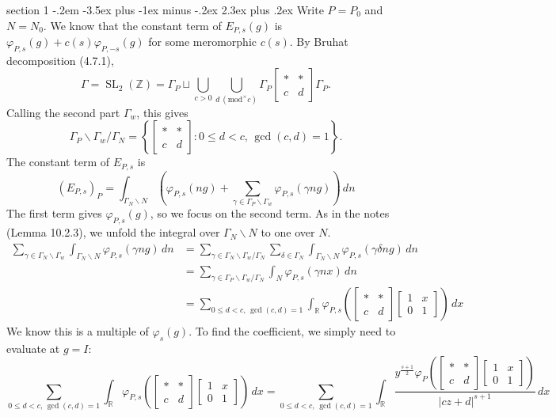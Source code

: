\documentclass[12pt]{article}
\makeatletter
\theoremstyle{norm}
\newcommand{\R}[0]{\mathbb{R}}
\newcommand{\Z}[0]{\mathbb{Z}}
\newcommand{\ga}[0]{\gamma}
\newcommand{\Ga}[0]{\Gamma}
\newcommand{\de}[0]{\delta}
\newcommand{\ph}[0]{\varphi}
\newcommand{\bc}[1]{\left\{ {#1} \right\}}
\newcommand{\pa}[1]{\left( {#1} \right)}
\newcommand{\SL}{\operatorname{SL}}
\newcommand{\bs}[0]{\backslash}
\newcommand{\mmod}[1]{\,(\text{mod}^{\times} #1)}
\newcommand{\matt}[4]{
\left[
\begin{matrix}
{#1}&{#2}\\
{#3}&{#4}
\end{matrix}
\right]}
\newcommand{\smatt}[4]{
\left[
\begin{smallmatrix}
{#1}&{#2}\\
{#3}&{#4}
\end{smallmatrix}
\right]}
\newcommand{\ir}[0]{\int_{\R}}
\newenvironment{problem}{\@startsection
       {section}
       {1}
       {-.2em}
       {-3.5ex plus -1ex minus -.2ex}
       {2.3ex plus .2ex}
       {\pagebreak[3]%
       \large\bf\noindent{Problem }
       }
       }
       {
       }
\makeatother
\begin{document}
\begin{problem}{\it }
Write $P=P_0$ and $N=N_0$. We know that the constant term of $E_{P,s}(g)$ is $\ph_{P,s}(g)+c(s)\ph_{P,-s}(g)$ for some meromorphic $c(s)$. By Bruhat decomposition (4.7.1), %
\[
\Ga=\SL_2(\Z)=\Ga_P\sqcup \bigcup_{c>0}\bigcup_{d\mmod{c}} \Ga_P\matt**cd\Ga_P.
\]
Calling the second part $\Ga_w$, this gives
\[
\Ga_P\bs\Ga_w/\Ga_N=\bc{\matt**cd:0\le d<c,\,\gcd(c,d)=1}.
\]
The constant term of $E_{P,s}$ is
\begin{equation}\label{ps11-1}
(E_{P,s})_P=\int_{\Ga_N\bs N} \pa{
\ph_{P,s}(ng)+\sum_{\ga\in \Ga_P\bs\Ga_w} \ph_{P,s}(\ga ng)
}\,dn
\end{equation}
The first term gives $\ph_{P,s}(g)$, so we focus on the second term. As in the notes (Lemma 10.2.3), we unfold the integral over $\Ga_N\bs N$ to one over $N$.
\begin{align*}
\sum_{\ga\in \Ga_N\bs \Ga_w} \int_{\Ga_N\bs N} \ph_{P,s}(\ga ng)
\,dn
&=\sum_{\ga\in \Ga_N\bs \Ga_w/\Ga_N}\sum_{\de\in \Ga_N} \int_{\Ga_N\bs N} \ph_{P,s}(\ga \de ng)
\,dn\\
&=\sum_{\ga\in \Ga_P\bs \Ga_w/\Ga_N} \int_N \ph_{P,s} (\ga nx)\,dn\\
&=\sum_{0\le d<c,\,\gcd(c,d)=1}\ir\ph_{P,s}\pa{
\matt **cd\matt 1x01
}\,dx
\end{align*}
%
We know this is a multiple of $\ph_s(g)$. To find the coefficient, we simply need to evaluate at $g=I$:
\[
\sum_{0\le d<c,\,\gcd(c,d)=1}
\ir \ph_{P,s} \pa{\matt **cd\matt 1x01}\,dx
=\sum_{0\le d<c,\,\gcd(c,d)=1}\ir \frac{y^{\frac{s+1}{2}}\ph_{P} \pa{\matt **cd\matt 1x01}}{|cz+d|^{s+1}}\,dx
\]
\end{problem}
\end{document}
